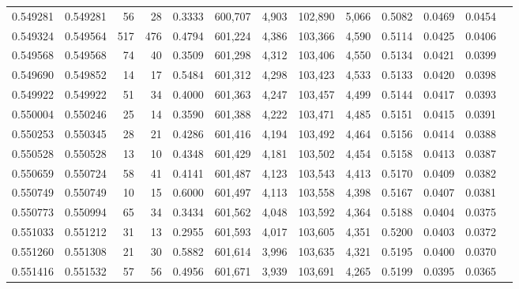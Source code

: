 \begin{tabular}{rrrrrrrrrrrrr}
0.549281 & 0.549281 &    56 &    28 &                                     0.3333 & 600,707 &   4,903 & 102,890 &   5,066 & 0.5082 & 0.0469 & 0.0454 \\
0.549324 & 0.549564 &   517 &   476 &                                     0.4794 & 601,224 &   4,386 & 103,366 &   4,590 & 0.5114 & 0.0425 & 0.0406 \\
0.549568 & 0.549568 &    74 &    40 &                                     0.3509 & 601,298 &   4,312 & 103,406 &   4,550 & 0.5134 & 0.0421 & 0.0399 \\
0.549690 & 0.549852 &    14 &    17 &                                     0.5484 & 601,312 &   4,298 & 103,423 &   4,533 & 0.5133 & 0.0420 & 0.0398 \\
0.549922 & 0.549922 &    51 &    34 &                                     0.4000 & 601,363 &   4,247 & 103,457 &   4,499 & 0.5144 & 0.0417 & 0.0393 \\
0.550004 & 0.550246 &    25 &    14 &                                     0.3590 & 601,388 &   4,222 & 103,471 &   4,485 & 0.5151 & 0.0415 & 0.0391 \\
0.550253 & 0.550345 &    28 &    21 &                                     0.4286 & 601,416 &   4,194 & 103,492 &   4,464 & 0.5156 & 0.0414 & 0.0388 \\
0.550528 & 0.550528 &    13 &    10 &                                     0.4348 & 601,429 &   4,181 & 103,502 &   4,454 & 0.5158 & 0.0413 & 0.0387 \\
0.550659 & 0.550724 &    58 &    41 &                                     0.4141 & 601,487 &   4,123 & 103,543 &   4,413 & 0.5170 & 0.0409 & 0.0382 \\
0.550749 & 0.550749 &    10 &    15 &                                     0.6000 & 601,497 &   4,113 & 103,558 &   4,398 & 0.5167 & 0.0407 & 0.0381 \\
0.550773 & 0.550994 &    65 &    34 &                                     0.3434 & 601,562 &   4,048 & 103,592 &   4,364 & 0.5188 & 0.0404 & 0.0375 \\
0.551033 & 0.551212 &    31 &    13 &                                     0.2955 & 601,593 &   4,017 & 103,605 &   4,351 & 0.5200 & 0.0403 & 0.0372 \\
0.551260 & 0.551308 &    21 &    30 &                                     0.5882 & 601,614 &   3,996 & 103,635 &   4,321 & 0.5195 & 0.0400 & 0.0370 \\
0.551416 & 0.551532 &    57 &    56 &                                     0.4956 & 601,671 &   3,939 & 103,691 &   4,265 & 0.5199 & 0.0395 & 0.0365 \\

\end{tabular}
